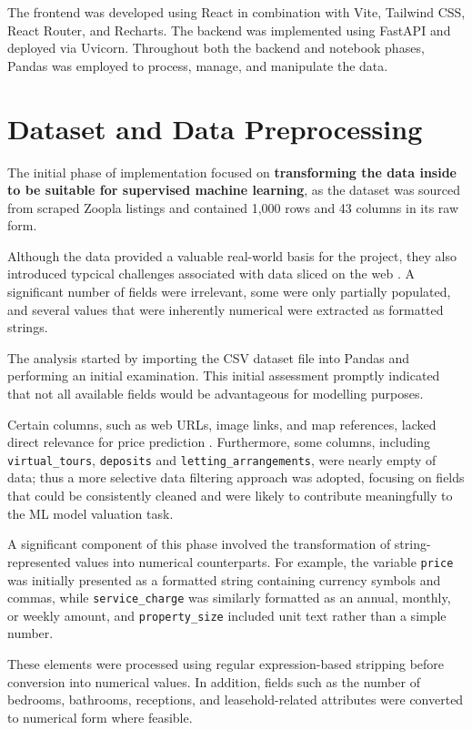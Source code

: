 The frontend was developed using React in combination with Vite, Tailwind CSS, React Router, and Recharts. The backend was implemented using FastAPI \parencite{FastAPI2025} and deployed via Uvicorn. Throughout both the backend and notebook phases, Pandas was employed to process, manage, and manipulate the data.


\section{Dataset and Data Preprocessing}

The initial phase of implementation focused on \textbf{transforming the data inside to be suitable for supervised machine learning}, as the dataset was sourced from scraped Zoopla listings and contained 1,000 rows and 43 columns in its raw form.

Although the data provided a valuable real-world basis for the project, they also introduced typcical challenges associated with data sliced on the web \parencite{Foerderer2023}. A significant number of fields were irrelevant, some were only partially populated, and several values that were inherently numerical were extracted as formatted strings.

The analysis started by importing the CSV dataset file into Pandas and performing an initial examination. This initial assessment promptly indicated that not all available fields would be advantageous for modelling purposes.

Certain columns, such as web URLs, image links, and map references, lacked direct relevance for price prediction \parencite{Kotsiantis2006}. Furthermore, some columns, including \texttt{virtual\_tours}, \texttt{deposits} and \texttt{letting\_arrangements}, were nearly empty of data; thus a more selective data filtering approach was adopted, focusing on fields that could be consistently cleaned and were likely to contribute meaningfully to the ML model valuation task.

A significant component of this phase involved the transformation of string-represented values into numerical counterparts. For example, the variable \texttt{price} was initially presented as a formatted string containing currency symbols and commas, while \texttt{service\_charge} was similarly formatted as an annual, monthly, or weekly amount, and \texttt{property\_size} included unit text rather than a simple number. 

These elements were processed using regular expression-based stripping before conversion into numerical values. In addition, fields such as the number of bedrooms, bathrooms, receptions, and leasehold-related attributes were converted to numerical form where feasible.

